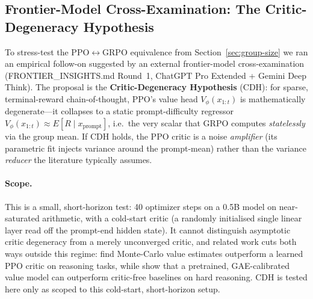 %
%

\subsection{Frontier-Model Cross-Examination: The Critic-Degeneracy Hypothesis}
\label{sec:frontier-critic-degeneracy}

To stress-test the PPO$\leftrightarrow$GRPO equivalence from
Section~\ref{sec:group-size} we ran an empirical follow-on suggested
by an external frontier-model cross-examination (FRONTIER\_INSIGHTS.md
Round~1, ChatGPT Pro Extended + Gemini Deep Think). The proposal is
the \textbf{Critic-Degeneracy Hypothesis} (CDH): for sparse,
terminal-reward chain-of-thought, PPO's value head
$V_\phi(x_{1:t})$ is mathematically degenerate---it collapses to a
static prompt-difficulty regressor
$V_\phi(x_{1:t}) \approx E[R \mid x_\text{prompt}]$, i.e.\ the very
scalar that GRPO computes \emph{statelessly} via the group mean. If
CDH holds, the PPO critic is a noise \emph{amplifier} (its parametric
fit injects variance around the prompt-mean) rather than the variance
\emph{reducer} the literature typically assumes.

\paragraph{Scope.}
This is a small, short-horizon test: 40 optimizer steps on a 0.5B
model on near-saturated arithmetic, with a cold-start critic (a
randomly initialised single linear layer read off the prompt-end
hidden state). It cannot distinguish asymptotic critic degeneracy
from a merely unconverged critic, and related work cuts both ways
outside this regime: \citet{kazemnejad2025vineppo} find
Monte-Carlo value estimates outperform a learned PPO critic on
reasoning tasks, while \citet{bytedance2025vapo} show that a
pretrained, GAE-calibrated value model can outperform critic-free
baselines on hard reasoning. CDH is tested here only as scoped to
this cold-start, short-horizon setup.

